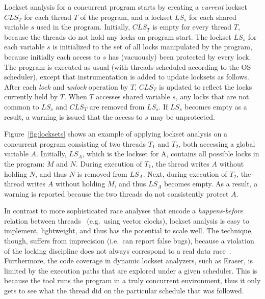 Lockset analysis for a concurrent program starts by creating a \emph{current} lockset $\mathit{CLS}_T$ for each thread $T$ of the program, and a lockset $\mathit{LS}_s$ for each shared variable $s$ used in the program. Initially, $\mathit{CLS}_T$ is empty for every thread $T$, because the threads do not hold any locks on program start. The lockset $\mathit{LS}_s$ for each variable $s$ is initialized to the set of all locks manipulated by the program, because initially each access to $s$ has (vacuously) been protected by every lock. The program is executed as usual (with threads scheduled according to the OS scheduler), except that instrumentation is added to update locksets as follows.
%
After each \emph{lock} and \emph{unlock} operation by $T$, $\mathit{CLS}_T$ is updated to reflect the locks currently held by $T$.
%
When $T$ accesses shared variable $s$, any locks that are not common to $\mathit{LS}_s$ and $\mathit{CLS}_T$ are removed from $\mathit{LS}_s$.
If $\mathit{LS}_s$ becomes empty as a result, a warning is issued that the access to $s$ may be unprotected.

Figure~\ref{fig:locksets} shows an example of applying lockset analysis on a concurrent program consisting of two threads $T_1$ and $T_2$, both accessing a global variable $A$. Initially, $\mathit{LS}_A$, which is the lockset for A, contains all possible locks in the program: $M$ and $N$. During execution of $T_1$, the thread writes $A$ without holding $N$, and thus $N$ is removed from $\mathit{LS}_A$. Next, during execution of $T_2$, the thread writes $A$ without holding $M$, and thus $\mathit{LS}_A$ becomes empty. As a result, a warning is reported because the two threads do not consistently protect $A$.

In contrast to more sophisticated race analyses that encode a \emph{happens-before} relation between threads~\cite{lamport1978time} (e.g.\ using vector clocks), lockset analysis is easy to implement, lightweight, and thus has the potential to scale well.  The technique, though, suffers from imprecision (i.e.\ can report false bugs), because a violation of the locking discipline does not always correspond to a real data race~\cite{savage1997eraser, pozniansky2003efficient, o2003hybrid, elmas2007goldilocks, flanagan2009fasttrack}. Furthermore, the code coverage in dynamic lockset analyzers, such as Eraser, is limited by the execution paths that are explored under a given scheduler. This is because the tool runs the program in a truly concurrent environment, thus it only gets to see what the thread did on the particular schedule that was followed.

